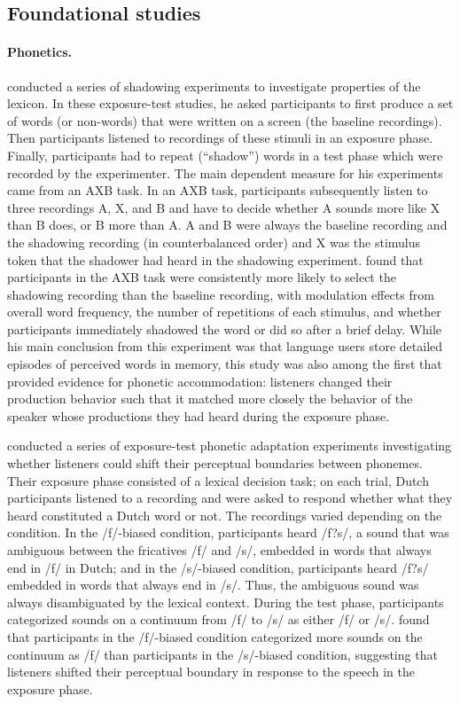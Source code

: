\subsection{Foundational studies}

\paragraph{Phonetics.} \textcite{Goldinger1998} conducted a series of shadowing experiments to investigate properties of the lexicon. In these exposure-test studies, 
he asked participants to first produce a set of words (or non-words) that were written on a screen (the baseline recordings). Then participants listened to recordings of these stimuli in 
an exposure phase. Finally, participants had to repeat (``shadow'') words in a test phase which were recorded by the experimenter. The main dependent measure
for his experiments came from an AXB task. In an AXB task, participants subsequently listen to three recordings A, X, and B and have to decide whether A sounds more like X
than B does, or B more than A. A and B were always the baseline recording and the shadowing recording (in counterbalanced order) and X was the stimulus token that the shadower had heard
in the shadowing experiment. \textcite{Goldinger1998} found that participants in the AXB task  were consistently more likely to select the shadowing recording than the baseline recording, with modulation
effects from overall word frequency, the number of repetitions of each stimulus, and whether participants immediately shadowed the word or did so after a brief delay. While his main conclusion
from this experiment was that language users store detailed episodes of perceived words in memory, this study was also among the first that provided evidence for phonetic accommodation: 
listeners changed their production behavior such that it matched more closely the behavior of the speaker whose productions they had heard during the exposure phase.

\textcite{Norris2003} conducted a series of exposure-test phonetic adaptation
experiments investigating whether listeners could shift their perceptual boundaries between phonemes. Their exposure phase
consisted of a lexical decision task; on each trial, Dutch participants listened to a recording and were asked to respond whether
what they heard constituted a Dutch word or not. The recordings varied depending on the condition. In the /f/-biased condition,
participants heard /f?s/, a sound that was ambiguous between the fricatives /f/ and /s/, embedded in words that always end in /f/
in Dutch; and in the /s/-biased condition, participants heard /f?s/ embedded in words that always end in /s/. Thus, the ambiguous sound was always 
disambiguated by the lexical context. During the test phase, participants categorized sounds on a continuum from /f/ to /s/ as either /f/ or /s/. \textcite{Norris2003}
found that participants in the /f/-biased condition categorized more sounds on the continuum as /f/ than participants in the /s/-biased condition,
suggesting that listeners shifted their perceptual boundary in response to the speech in the exposure phase.
 

